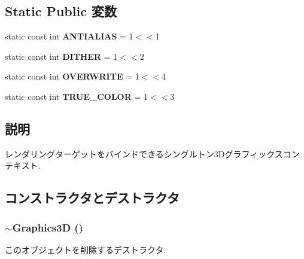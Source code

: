 \subsection*{Static Public 変数}
\begin{CompactItemize}
\item 
\hypertarget{classm3g_1_1Graphics3D_9df12c5332904e66a962e1bf2809a812}{
static const int \textbf{ANTIALIAS} = 1$<$$<$1}
\label{classm3g_1_1Graphics3D_9df12c5332904e66a962e1bf2809a812}

\item 
\hypertarget{classm3g_1_1Graphics3D_3750f57b82328be988bdab3b672a64f9}{
static const int \textbf{DITHER} = 1$<$$<$2}
\label{classm3g_1_1Graphics3D_3750f57b82328be988bdab3b672a64f9}

\item 
\hypertarget{classm3g_1_1Graphics3D_f448f7f447a301823af9170bfe84c50e}{
static const int \textbf{OVERWRITE} = 1$<$$<$4}
\label{classm3g_1_1Graphics3D_f448f7f447a301823af9170bfe84c50e}

\item 
\hypertarget{classm3g_1_1Graphics3D_bbd22a6baea672f895d5ef32e2438ec6}{
static const int \textbf{TRUE\_\-COLOR} = 1$<$$<$3}
\label{classm3g_1_1Graphics3D_bbd22a6baea672f895d5ef32e2438ec6}

\end{CompactItemize}


\subsection{説明}
レンダリングターゲットをバインドできるシングルトン3Dグラフィックスコンテキスト. 

\subsection{コンストラクタとデストラクタ}
\hypertarget{classm3g_1_1Graphics3D_9b9347476fc10e57b31694ac8a628511}{
\subsubsection[{$\sim$Graphics3D}]{\setlength{\rightskip}{0pt plus 5cm}$\sim${\bf Graphics3D} ()}}
\label{classm3g_1_1Graphics3D_9b9347476fc10e57b31694ac8a628511}


このオブジェクトを削除するデストラクタ. 


